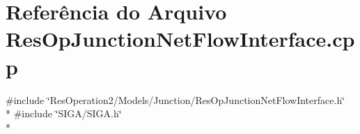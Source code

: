 \section{Referência do Arquivo Res\+Op\+Junction\+Net\+Flow\+Interface.\+cpp}
\label{_res_op_junction_net_flow_interface_8cpp}
{\ttfamily \#include \char`\"{}Res\+Operation2/\+Models/\+Junction/\+Res\+Op\+Junction\+Net\+Flow\+Interface.\+h\char`\"{}}\\*
{\ttfamily \#include \char`\"{}S\+I\+G\+A/\+S\+I\+G\+A.\+h\char`\"{}}\\*
